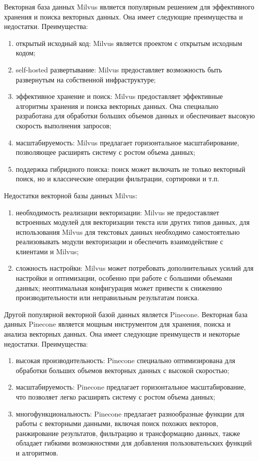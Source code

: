 Векторная база данных Milvus является популярным решением для эффективного хранения и поиска векторных данных. Она имеет следующие преимущества и недостатки. Преимущества:
\begin{enumerate}
    \item открытый исходный код: Milvus является проектом с открытым исходным кодом;
    \item self-hosted развертывание: Milvus предоставляет возможность быть развернутым на собственной инфраструктуре;
    \item эффективное хранение и поиск: Milvus предоставляет эффективные алгоритмы хранения и поиска векторных данных. Она специально разработана для обработки больших объемов данных и обеспечивает высокую скорость выполнения запросов;
    \item масштабируемость: Milvus предлагает горизонтальное масштабирование, позволяющее расширять систему с ростом объема данных;
    \item поддержка гибридного поиска: поиск может включать не только векторный поиск, но и классические операции фильтрации, сортировки и т.п.
\end{enumerate}

Недостатки векторной базы данных Milvus:
\begin{enumerate}
    \item необходимость реализации векторизации: Milvus не предоставляет встроенных модулей для векторизации текста или других типов данных, для использования Milvus для текстовых данных необходимо самостоятельно реализовывать модули векторизации и обеспечить взаимодействие с клиентами и Milvus;
    \item сложность настройки: Milvus может потребовать дополнительных усилий для настройки и оптимизации, особенно при работе с большими объемами данных; неоптимальная конфигурация может привести к снижению производительности или неправильным результатам поиска.
\end{enumerate}

Другой популярной векторной базой данных является Pinecone. Векторная база данных Pinecone является мощным инструментом для хранения, поиска и анализа векторных данных. Она имеет следующие преимуществ и некоторые недостатки. Преимущества:

\begin{enumerate}
    \item высокая производительность: Pinecone специально оптимизирована для обработки больших объемов векторных данных с высокой скоростью;
    \item масштабируемость: Pinecone предлагает горизонтальное масштабирование, что позволяет легко расширять систему с ростом объема данных;
    \item многофункциональность: Pinecone предлагает разнообразные функции для работы с векторными данными, включая поиск похожих векторов, ранжирование результатов, фильтрацию и трансформацию данных, также обладает гибкими возможностями для добавления пользовательских функций и алгоритмов.
\end{enumerate}

